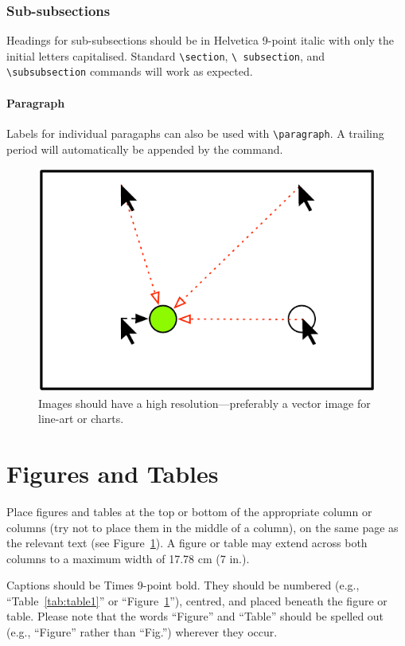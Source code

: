 \documentclass[preprint]{../latex/sigchi-modern}
\begin{document}
\subsubsection{Sub-subsections}
Headings for sub-subsections should be in Helvetica 9-point italic with only the
initial letters capitalised.
Standard \texttt{\textbackslash sec\-tion}, \texttt{\textbackslash
subsection}, and \texttt{\textbackslash subsubsection} commands will work as
expected.

\paragraph{Paragraph} Labels for individual paragaphs can also be used with
\texttt{\textbackslash paragraph}. A trailing period will automatically be
appended by the command.

\begin{figure}
  \centering
  \includegraphics[width=0.9\columnwidth]{figure}
  \caption{Images should have a high resolution---preferably a vector image 
      for line-art or charts.}
  \label{fig:sample}
\end{figure}

\section{Figures and Tables}
Place figures and tables at the top or bottom of the appropriate column or
columns (try not to place them in the middle of a column), on the same page as
the relevant text (see Figure~\ref{fig:sample}). A figure or table may extend
across both columns to a maximum width of 17.78 cm (7 in.).

Captions should be Times 9-point bold. They should be numbered (e.g.,
``Table~\ref{tab:table1}'' or ``Figure~\ref{fig:sample}''), centred, and placed
beneath the figure or table. Please note that the words ``Figure'' and ``Table''
should be spelled out (e.g., ``Figure'' rather than ``Fig.'') wherever they
occur.
\end{document}

